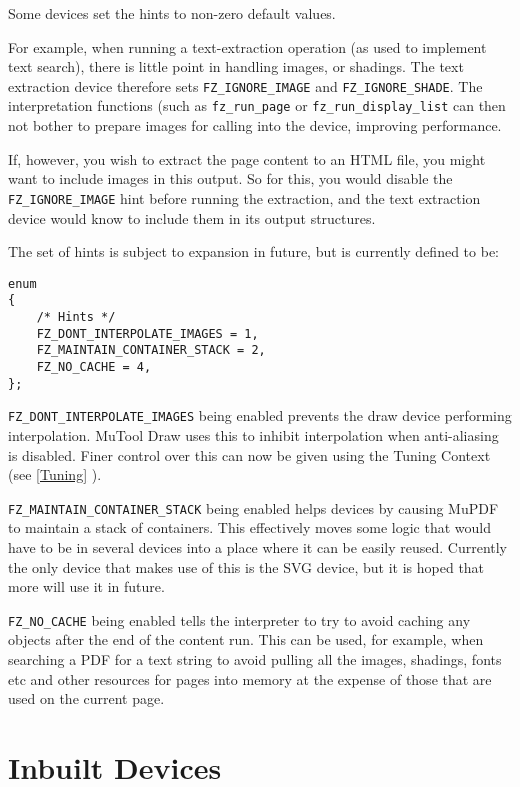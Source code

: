 \documentclass[oneside]{book}
\newcommand{\rjwref}[1] {\autoref{#1} \nameref{#1}}
\begin{document}
Some devices set the hints to non-zero default values.

For example, when running a text-extraction operation (as used to implement text search), there is little point in handling images, or shadings. The text extraction device therefore sets \texttt{FZ\_IGNORE\_IMAGE} and \texttt{FZ\_IGNORE\_SHADE}. The interpretation functions (such as \texttt{fz\_run\_page} or \texttt{fz\_run\_display\_list} can then not bother to prepare images for calling into the device, improving performance.

If, however, you wish to extract the page content to an HTML file, you might want to include images in this output. So for this, you would disable the \texttt{FZ\_IGNORE\_IMAGE} hint before running the extraction, and the text extraction device would know to include them in its output structures.

The set of hints is subject to expansion in future, but is currently defined to be:

\begin{lstlisting}
enum
{
	/* Hints */
	FZ_DONT_INTERPOLATE_IMAGES = 1,
	FZ_MAINTAIN_CONTAINER_STACK = 2,
	FZ_NO_CACHE = 4,
};
\end{lstlisting}

\texttt{FZ\_DONT\_INTERPOLATE\_IMAGES} being enabled prevents the draw device performing interpolation. MuTool Draw uses this to inhibit interpolation when anti-aliasing is disabled. Finer control over this can now be given using the Tuning Context (see \rjwref{Tuning}).

\texttt{FZ\_MAINTAIN\_CONTAINER\_STACK} being enabled helps devices by causing MuPDF to maintain a stack of containers. This effectively moves some logic that would have to be in several devices into a place where it can be easily reused. Currently the only device that makes use of this is the SVG device, but it is hoped that more will use it in future.

\texttt{FZ\_NO\_CACHE} being enabled tells the interpreter to try to avoid caching any objects after the end of the content run. This can be used, for example, when searching a PDF for a text string to avoid pulling all the images, shadings, fonts etc and other resources for pages into memory at the expense of those that are used on the current page.

\section{Inbuilt Devices}
\end{document}
